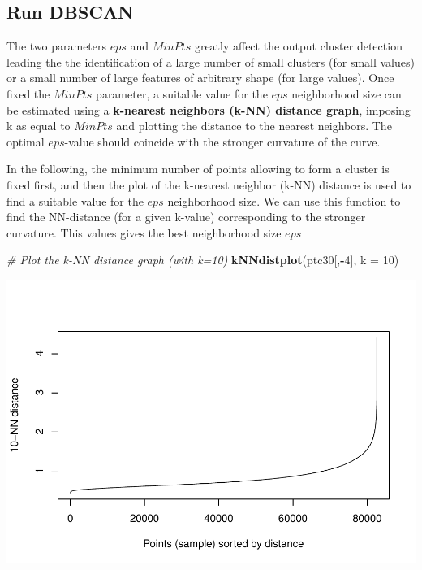\documentclass[
]{book}
\newenvironment{Shaded}{\begin{snugshade}}{\end{snugshade}}
\newcommand{\AttributeTok}[1]{\textcolor[rgb]{0.13,0.29,0.53}{#1}}
\newcommand{\CommentTok}[1]{\textcolor[rgb]{0.56,0.35,0.01}{\textit{#1}}}
\newcommand{\DecValTok}[1]{\textcolor[rgb]{0.00,0.00,0.81}{#1}}
\newcommand{\FunctionTok}[1]{\textcolor[rgb]{0.13,0.29,0.53}{\textbf{#1}}}
\newcommand{\NormalTok}[1]{#1}
\newcommand{\SpecialCharTok}[1]{\textcolor[rgb]{0.81,0.36,0.00}{\textbf{#1}}}
\begin{document}
\hypertarget{run-dbscan}{%
\subsection{Run DBSCAN}\label{run-dbscan}}

The two parameters \(eps\) and \(MinPts\) greatly affect the output cluster detection leading the the identification of a large number of small clusters (for small values) or a small number of large features of arbitrary shape (for large values).
Once fixed the \(MinPts\) parameter, a suitable value for the \(eps\) neighborhood size can be estimated using a \textbf{k-nearest neighbors (k-NN) distance graph}, imposing k as equal to \(MinPts\) and plotting the distance to the nearest neighbors.
The optimal \(eps\)-value should coincide with the stronger curvature of the curve.

In the following, the minimum number of points allowing to form a cluster is fixed first, and then the plot of the k-nearest neighbor (k-NN) distance is used to find a suitable value for the \(eps\) neighborhood size.
We can use this function to find the NN-distance (for a given k-value) corresponding to the stronger curvature.
This values gives the best neighborhood size \(eps\)

\begin{Shaded}
\begin{Highlighting}[]
\CommentTok{\# Plot the k{-}NN distance graph (with k=10)}
\FunctionTok{kNNdistplot}\NormalTok{(ptc30[,}\SpecialCharTok{{-}}\DecValTok{4}\NormalTok{], }\AttributeTok{k =} \DecValTok{10}\NormalTok{)}
\end{Highlighting}
\end{Shaded}

\includegraphics{04-DBSCAN_files/figure-latex/k-NN-graph-1.pdf}
\end{document}

